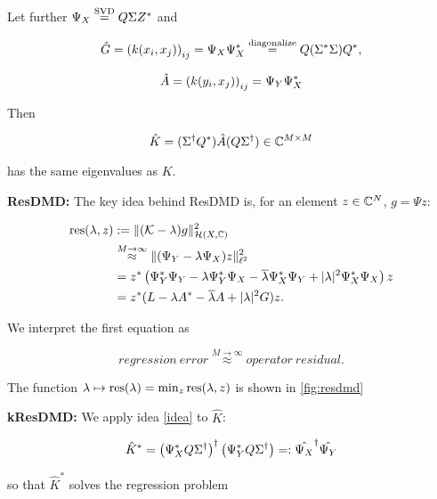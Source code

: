 Let further $\Psi_X \stackrel{\text{SVD}}{=} Q \Sigma Z^*$ and

\begin{equation}
    \hat{G} = \left( k(x_i, x_j) \right)_{i j} = 
    \Psi_X \Psi_X^* 
    \stackrel{\text{diagonalize}}{=} Q (\Sigma^* \Sigma) Q^*, 
\end{equation}

\begin{equation}
    \hat{A} = \left( k(y_i, x_j) \right)_{i j} = 
    \Psi_Y \Psi_X^*
\end{equation}

Then 

\begin{equation}
    \hat{K} = ( \Sigma^\dagger Q^* ) \hat{A} ( Q \Sigma^\dagger ) \in \mathbb{C}^{M \times M}
\end{equation}

has the same eigenvalues as $K$. 

\textbf{ResDMD:} The key idea behind ResDMD is, for an element $z \in \mathbb{C}^N$, 
$g = \Psi z$: 

\begin{align}
    \text{res} (\lambda, z) &:= 
    \| (\mathcal{K} - \lambda) g \|_{\mathcal{H} (X, \mathbb{C})}^2 \\
    &\stackrel{M \to \infty}{\approx} \| (\Psi_Y - \lambda \Psi_X) z \|_{\ell^2}^2 \\
    &= z^* \left( \Psi_Y^* \Psi_Y - \lambda \Psi_Y^* \Psi_X - \overline{\lambda} \Psi_X^* \Psi_Y + 
    | \lambda |^2 \Psi_X^* \Psi_X \right) z \\
    &= z^* (L - \lambda A^* - \overline{\lambda} A + | \lambda |^2 G) z . 
\end{align}

We interpret the first equation as 

\begin{equation}
    \label{idea}
    regression\ error \stackrel{M \to \infty}{\approx} operator\ residual .
\end{equation}

The function $\lambda \mapsto \text{res} (\lambda) = \min_z \text{res} (\lambda, z)$ is shown in 
\ref{fig:resdmd}

\textbf{kResDMD:} We apply idea \ref{idea} to $\hat{K}$: 

\begin{equation}
    \hat{K}^* = \left( \Psi_X^* Q \Sigma^\dagger \right)^\dagger 
    \left( \Psi_Y^* Q \Sigma^\dagger \right) =:
    \hat{\Psi_X}^\dagger \hat{\Psi_Y}
\end{equation}

so that $\hat{K}^*$ solves the regression problem

